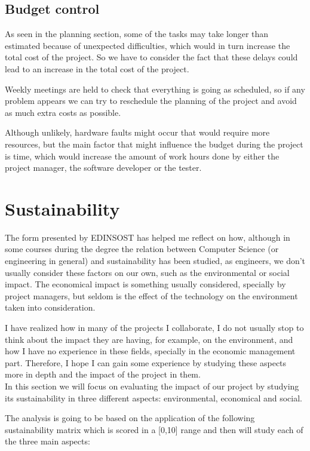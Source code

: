 \subsection{Budget control}

As seen in the planning section, some of the tasks may take longer than estimated because of unexpected difficulties, which would in turn increase the total cost of the project. So we have to consider the fact that these delays could lead to an increase in the total cost of the project. 

Weekly meetings are held to check that everything is going as scheduled, so if any problem appears we can try to reschedule the planning of the project and avoid as much extra costs as possible.

Although unlikely, hardware faults might occur that would require more resources, but the main factor that might influence the budget during the project is time, which would increase the amount of work hours done by either the project manager, the software developer or the tester.

\section{Sustainability}

The form presented by EDINSOST has helped me reflect on how, although in some courses during the degree the relation between Computer Science (or engineering in general) and sustainability has been studied, as engineers, we don't usually consider these factors on our own, such as the environmental or social impact. The economical impact is something usually considered, specially by project managers, but seldom is the effect of the technology on the environment taken into consideration.

I have realized how in many of the projects I collaborate, I do not usually stop to think about the impact they are having, for example, on the environment, and how I have no experience in these fields, specially in the economic management part. Therefore, I hope I can gain some experience by studying these aspects more in depth and the impact of the project in them. \\

In this section we will focus on evaluating the impact of our project by studying its sustainability in three different aspects: environmental, economical and social.

The analysis is going to be based on the application of the following sustainability matrix which is scored in a [0,10] range and then will study each of the three main aspects:

